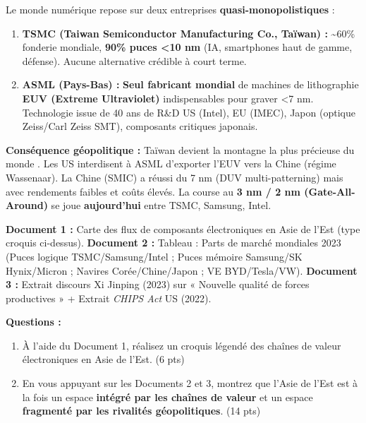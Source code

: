 \documentclass[11pt]{article}
\begin{document}
\begin{savaistu}
Le monde numérique repose sur deux entreprises \textbf{quasi-monopolistiques} :
\begin{enumerate}
    \item \textbf{TSMC (Taiwan Semiconductor Manufacturing Co., Taïwan) :} \textasciitilde 60\% fonderie mondiale, \textbf{90\% puces <10 nm} (IA, smartphones haut de gamme, défense). Aucune alternative crédible à court terme.
    \item \textbf{ASML (Pays-Bas) :} \textbf{Seul fabricant mondial} de machines de lithographie \textbf{EUV (Extreme Ultraviolet)} indispensables pour graver <7 nm. Technologie issue de 40 ans de R\&D US (Intel), EU (IMEC), Japon (optique Zeiss/Carl Zeiss SMT), composants critiques japonais.
\end{enumerate}
\textbf{Conséquence géopolitique :} Taïwan devient la \og montagne la plus précieuse du monde \fg. Les US interdisent à ASML d'exporter l'EUV vers la Chine (régime Wassenaar). La Chine (SMIC) a réussi du 7 nm (DUV multi-patterning) mais avec rendements faibles et coûts élevés. La course au \textbf{3 nm / 2 nm (Gate-All-Around)} se joue \textbf{aujourd'hui} entre TSMC, Samsung, Intel.
\end{savaistu}

\begin{exercice}
\textbf{Document 1 :} Carte des flux de composants électroniques en Asie de l'Est (type croquis ci-dessus).
\textbf{Document 2 :} Tableau : Parts de marché mondiales 2023 (Puces logique TSMC/Samsung/Intel ; Puces mémoire Samsung/SK Hynix/Micron ; Navires Corée/Chine/Japon ; VE BYD/Tesla/VW).
\textbf{Document 3 :} Extrait discours Xi Jinping (2023) sur « Nouvelle qualité de forces productives » + Extrait \emph{CHIPS Act} US (2022).

\textbf{Questions :}
\begin{enumerate}
    \item À l'aide du Document 1, réalisez un croquis légendé des chaînes de valeur électroniques en Asie de l'Est. (6 pts)
    \item En vous appuyant sur les Documents 2 et 3, montrez que l'Asie de l'Est est à la fois un espace \textbf{intégré par les chaînes de valeur} et un espace \textbf{fragmenté par les rivalités géopolitiques}. (14 pts)
\end{enumerate}
\end{exercice}
\end{document}
